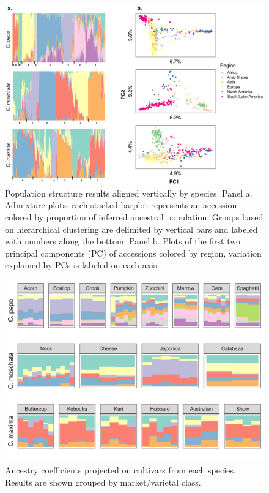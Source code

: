 \documentclass[utf8]{FrontiersinHarvard} %
\begin{document}
\begin{figure}[h]
	\begin{center}
		\includegraphics[width=18cm]{../../figures/02_fig.png}%
	\end{center}
	\caption{Population structure results aligned vertically by species. Panel a. Admixture plots: each stacked barplot represents an accession colored by proportion of inferred ancestral population. Groups based on hierarchical clustering are delimited by vertical bars and labeled with numbers along the bottom. Panel b. Plots of the first two principal components (PC) of accessions colored by region, variation explained by PCs is labeled on each axis. \label{fig:2}}
\end{figure}

\begin{figure}[h]
	\begin{center}
		\includegraphics[width=15cm]{../../figures/03_fig.png}%
	\end{center}
	\caption{Ancestry coefficients projected on cultivars from each species. Results are shown grouped by market/varietal class. \label{fig:3}}
\end{figure}
\end{document}
